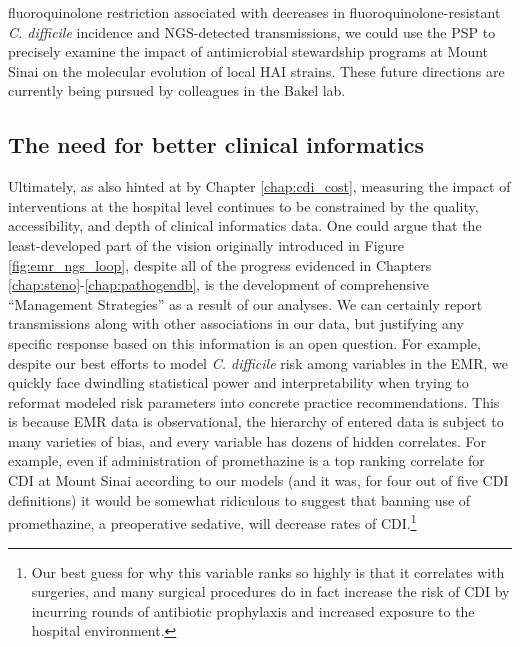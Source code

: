 fluoroquinolone restriction associated with decreases in fluoroquinolone-resistant \emph{C. difficile} incidence and NGS-detected transmissions\autocite{Dingle2017}, we could use the PSP to precisely examine the impact of antimicrobial stewardship programs at Mount Sinai on the molecular evolution of local HAI strains. These future directions are currently being pursued by colleagues in the Bakel lab.

\subsection{The need for better clinical informatics}

Ultimately, as also hinted at by Chapter \ref{chap:cdi_cost}, measuring the impact of interventions at the hospital level continues to be constrained by the quality, accessibility, and depth of clinical informatics data. One could argue that the least-developed part of the vision originally introduced in Figure \ref{fig:emr_ngs_loop}, despite all of the progress evidenced in Chapters \ref{chap:steno}-\ref{chap:pathogendb}, is the development of comprehensive ``Management Strategies'' as a result of our analyses. We can certainly report transmissions along with other associations in our data, but justifying any specific response based on this information is an open question. For example, despite our best efforts to model \emph{C. difficile} risk among variables in the EMR, we quickly face dwindling statistical power and interpretability when trying to reformat modeled risk parameters into concrete practice recommendations. This is because EMR data is observational, the hierarchy of entered data is subject to many varieties of bias, and every variable has dozens of hidden correlates. For example, even if administration of promethazine is a top ranking correlate for CDI at Mount Sinai according to our models (and it was, for four out of five CDI definitions) it would be somewhat ridiculous to suggest that banning use of promethazine, a preoperative sedative, will decrease rates of CDI.\footnote{Our best guess for why this variable ranks so highly is that it correlates with surgeries, and many surgical procedures do in fact increase the risk of CDI by incurring rounds of antibiotic prophylaxis and increased exposure to the hospital environment.}

